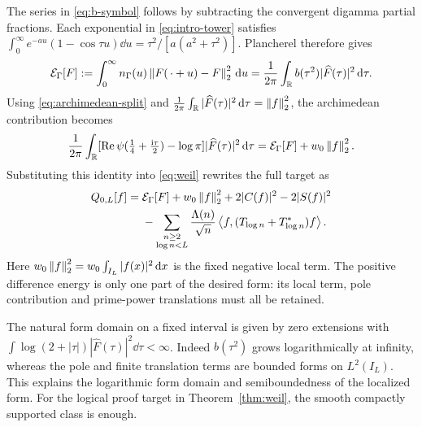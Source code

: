 The series in \eqref{eq:b-symbol} follows by subtracting the convergent digamma partial
fractions. Each exponential in \eqref{eq:intro-tower} satisfies
$\int_0^\infty e^{-a u}(1-\cos\tau u)\dd u
=\tau^2/[a(a^2+\tau^2)]$. Plancherel therefore gives
\begin{equation}\label{eq:kinetic}
 \mathcal E_\Gamma[F]
 :=\int_0^\infty n_\Gamma(u)\left\lVert F(\,\cdot+u)-F\right\rVert_2^2\,\mathrm d u
 =\frac1{2\pi}\int_\mathbb R b(\tau^2)|\widehat F(\tau)|^2\,\mathrm d\tau.
\end{equation}
Using \eqref{eq:archimedean-split} and
$\frac1{2\pi}\int_\mathbb R|\widehat F(\tau)|^2\,\mathrm d\tau=\left\lVert f\right\rVert_2^2$,
the archimedean contribution becomes
\begin{equation}\label{eq:archimedean-energy}
 \frac1{2\pi}\int_\mathbb R
 [\operatorname{Re}\psi(\tfrac14+\tfrac{\mathrm i\tau}2)-\log\pi]
 |\widehat F(\tau)|^2\,\mathrm d\tau
 =\mathcal E_\Gamma[F]+w_0\left\lVert f\right\rVert_2^2.
\end{equation}
Substituting this identity into \eqref{eq:weil} rewrites the full target as
\begin{align}\label{eq:weil-energy}
 Q_{0,L}[f]={}&\mathcal E_\Gamma[F]+w_0\left\lVert f\right\rVert_2^2
 +2|C(f)|^2-2|S(f)|^2\notag\\
 &-\sum_{\substack{n\geq2\\\log n<L}}
 \frac{\Lambda(n)}{\sqrt n}\left\langle f,(T_{\log n}+T_{\log n}^*)f\right\rangle.
\end{align}
Here $w_0\left\lVert f\right\rVert_2^2=w_0\int_{I_L}|f(x)|^2\,\mathrm d x$ is the fixed
negative local term. The positive difference energy is only one part of
the desired form: its local term, pole contribution and prime-power
translations must all be retained.

The natural form domain on a fixed interval is given by zero extensions
with $\int\log(2+|\tau|)|\widehat F(\tau)|^2\dd\tau<\infty$.
Indeed $b(\tau^2)$ grows logarithmically at infinity, whereas the pole
and finite translation terms are bounded forms on $L^2(I_L)$. This
explains the logarithmic form domain and semiboundedness of the
localized form. For the logical proof target in Theorem~\ref{thm:weil},
the smooth compactly supported class is enough.
